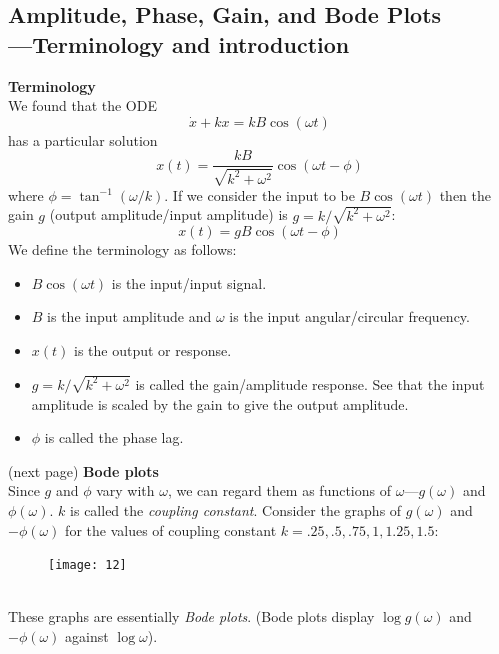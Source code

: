 \documentclass{report}
\begin{document}
\subsection{Amplitude, Phase, Gain, and Bode Plots\\---Terminology and introduction}
\textbf{Terminology}\\
We found that the ODE
\begin{equation*}
\dot{x}+kx=kB\cos(\omega t)
\end{equation*}
has a particular solution
\begin{equation*}
x(t)=\frac{kB}{\sqrt{k^2+\omega^2}}\cos(\omega t-\phi)
\end{equation*}
where $\phi=\tan^{-1}(\omega/k)$. If we consider the input to be $B\cos(\omega t)$ then the 
gain $g$ (output amplitude/input amplitude) is $g=k/\sqrt{k^2+\omega^2}$:
\begin{equation*}
x(t)=gB\cos(\omega t-\phi)
\end{equation*}
We define the terminology as follows:
\begin{itemize}
\item $B\cos(\omega t)$ is the input/input signal.
\item $B$ is the input amplitude and $\omega$ is the input angular/circular frequency.
\item $x(t)$ is the output or response.
\item $g=k/\sqrt{k^2+\omega^2}$ is called the gain/amplitude response. 
See that the input amplitude is scaled by the gain to give the output amplitude.
\item $\phi$ is called the phase lag.
\end{itemize}
(next page)
\newpage
\noindent\textbf{Bode plots}\\
Since $g$ and $\phi$ vary with 
$\omega$, we can regard them as functions of $\omega$---$g(\omega)$ and $\phi(\omega)$.
$k$ is called the \textit{coupling constant}. Consider the graphs of $g(\omega)$ and $-\phi(\omega)$ for 
the values of coupling constant $k=.25,.5,.75,1,1.25,1.5$:
\begin{figure}[h]
\begin{center}
\texttt{[image: 12]}\\
\end{center}
\end{figure}\\
These graphs are essentially \textit{Bode plots}. (Bode plots display $\log g(\omega)$ and $-\phi(\omega)$ against 
$\log\omega$).
\newpage
\end{document}
